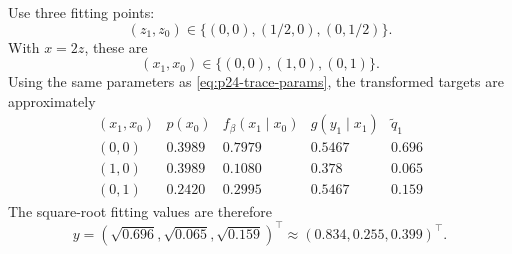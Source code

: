 \documentclass[11pt]{article}
\numberwithin{equation}{section}
\begin{document}
Use three fitting points:
\begin{equation}
    (z_1,z_0)\in\{(0,0),(1/2,0),(0,1/2)\}.
    \label{eq:p25-trace2-3}
\end{equation}
With \(x=2z\), these are
\begin{equation}
    (x_1,x_0)\in\{(0,0),(1,0),(0,1)\}.
    \label{eq:p25-trace2-4}
\end{equation}
Using the same parameters as \eqref{eq:p24-trace-params}, the transformed
targets are approximately
\begin{equation}
\begin{array}{c|c|c|c|c}
(x_1,x_0) & p(x_0) & f_\beta(x_1\mid x_0) & g(y_1\mid x_1) &
\widetilde q_1\\
\hline
(0,0) & 0.3989 & 0.7979 & 0.5467 & 0.696\\
(1,0) & 0.3989 & 0.1080 & 0.378 & 0.065\\
(0,1) & 0.2420 & 0.2995 & 0.5467 & 0.159
\end{array}
\label{eq:p25-trace2-5}
\end{equation}
The square-root fitting values are therefore
\begin{equation}
    y=
    (\sqrt{0.696},\sqrt{0.065},\sqrt{0.159})^\top
    \approx
    (0.834,0.255,0.399)^\top.
    \label{eq:p25-trace2-6}
\end{equation}
\end{document}
